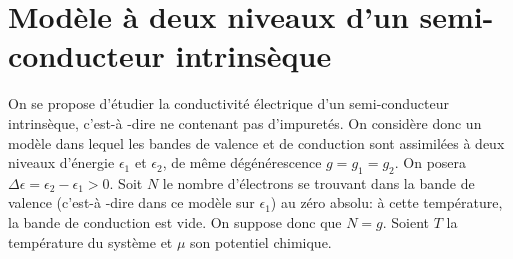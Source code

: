 \documentclass[utf8, 11pt]{feuille}
\begin{document}
%
%
%
%
%



\section{Modèle à  deux niveaux d'un semi-conducteur intrinsèque}

On se propose d'étudier la conductivité électrique d'un semi-conducteur intrinsèque, c'est-à -dire ne contenant pas d'impuretés. On considère donc un modèle dans lequel les bandes de valence et de conduction sont assimilées à  deux niveaux d'énergie $\epsilon_1$ et $\epsilon_2$, de même dégénérescence $g=g_1=g_2$. On posera $\Delta \epsilon=\epsilon_2-\epsilon_1 > 0$. Soit $N$ le nombre d'électrons se trouvant dans la bande de valence (c'est-à -dire dans ce modèle sur $\epsilon_1$) au zéro absolu:  à  cette température, la bande de conduction est vide. On suppose donc que $N=g$. Soient $T$ la température du système et $\mu$ son potentiel chimique.
\end{document}
